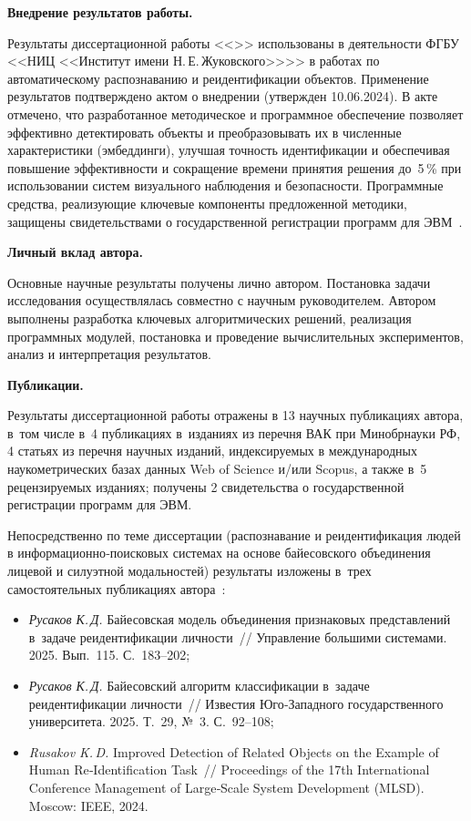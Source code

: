 \textbf{Внедрение результатов работы.}

Результаты диссертационной работы <<\thesisTitle>> использованы
в деятельности ФГБУ <<НИЦ <<Институт имени Н.\,Е.\,Жуковского>>>>
в работах по автоматическому распознаванию и реидентификации объектов.
Применение результатов подтверждено актом о внедрении (утвержден
10.06.2024). В акте отмечено, что разработанное методическое и
программное обеспечение позволяет эффективно детектировать объекты и
преобразовывать их в численные характеристики (эмбеддинги), улучшая
точность идентификации и обеспечивая повышение эффективности и
сокращение времени принятия решения до~5\,\% при использовании систем
визуального наблюдения и безопасности. Программные средства, реализующие
ключевые компоненты предложенной методики, защищены свидетельствами
о государственной регистрации программ для
ЭВМ~\cite{prog_reid_bayes,prog_detect_small}.

\textbf{Личный вклад автора.}

Основные научные результаты получены лично автором. Постановка задачи
исследования осуществлялась совместно с научным руководителем. Автором
выполнены разработка ключевых алгоритмических решений, реализация программных
модулей, постановка и проведение вычислительных экспериментов, анализ и
интерпретация результатов.

\textbf{Публикации.}

Результаты диссертационной работы отражены в 13 научных публикациях
автора, в~том числе в~4 публикациях в~изданиях из перечня ВАК при
Минобрнауки РФ, 4 статьях из перечня научных изданий, индексируемых в
международных наукометрических базах данных Web of Science и/или Scopus,
а также в~5 рецензируемых изданиях; получены 2 свидетельства о
государственной регистрации программ для ЭВМ.

Непосредственно по теме диссертации (распознавание и реидентификация
людей в информационно‑поисковых системах на основе байесовского
объединения лицевой и силуэтной модальностей) результаты изложены
в~трех самостоятельных публикациях автора~\cite{Rusakov2025bayesmodel,Rusakov2025bayesclass,Rusakov2024mlsd}:
\begin{itemize}
    \item \emph{Русаков К.\,Д.} Байесовская модель объединения признаковых
    представлений в~задаче реидентификации личности~// Управление большими
    системами. 2025. Вып.~115. С.~183--202;

    \item \emph{Русаков К.\,Д.} Байесовский алгоритм классификации в~задаче
    реидентификации личности~// Известия Юго‑Западного государственного
    университета. 2025. Т.~29, №~3. С.~92--108;

    \item \emph{Rusakov K.\,D.} Improved Detection of Related Objects on
    the Example of Human Re‑Identification Task~// Proceedings of the
    17th International Conference Management of Large‑Scale System
    Development (MLSD). Moscow: IEEE, 2024.
\end{itemize}

